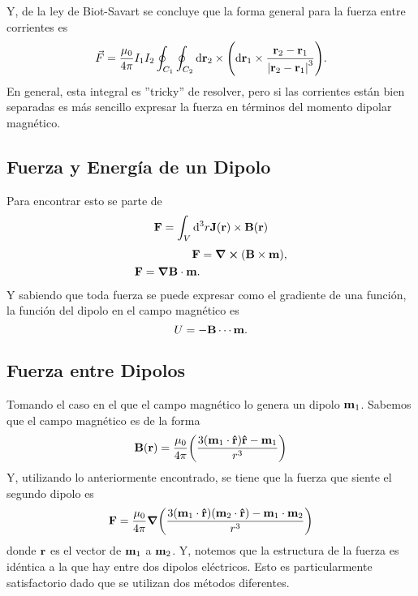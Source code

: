 Y, de la ley de Biot-Savart se concluye que la forma general para la fuerza entre corrientes es
\begin{equation}
    \vec{F} = \frac{\mu_0}{4\pi} I_1 I_2 \oint _{C_1} \oint _{C_2} \dd{\vb{r}_2} \times \qty(\dd{\vb{r}_1} \times \frac{\vb{r}_2 - \vb{r}_1}{\abs{\vb{r}_2 - \vb{r}_1}^3}).
\end{equation}
En general, esta integral es ''tricky'' de resolver, pero si las corrientes están bien separadas es más sencillo expresar la fuerza en términos del momento dipolar magnético.


\subsection{Fuerza y Energía de un Dipolo}
Para encontrar esto se parte de
\begin{equation}
    \vb{F} = \int _V \dd ^3 r \vb{J} (\vb{r}) \times \vb{B} (\vb{r})
\end{equation}
\begin{align}
    \vb{F} &= \curl{(\vb{B} \times \vb{m})}, \\
    \vb{F} = \grad{\vb{B} \cdot \vb{m}}.
\end{align}
Y sabiendo que toda fuerza se puede expresar como el gradiente de una función, la función del dipolo en el campo magnético es
\begin{equation}
    U = -\vb{B} \cdots \vb{m}.
\end{equation}


\subsection{Fuerza entre Dipolos}
Tomando el caso en el que el campo magnético lo genera un dipolo $\vb{m} _1$. Sabemos que el campo magnético es de la forma
\begin{equation}
    \vb{B} (\vb{r}) = \frac{\mu_0}{4\pi} \qty(\frac{3(\vb{m}_1 \cdot \vu{r}) \vu{r} - \vb{m}_1}{r^3})
\end{equation}
Y, utilizando lo anteriormente encontrado, se tiene que la fuerza que siente el segundo dipolo es
\begin{equation}
    \vb{F} = \frac{\mu_0}{4\pi} \grad{\qty(\frac{3(\vb{m}_1 \cdot \vu{r}) (\vb{m}_2 \cdot \vu{r}) - \vb{m}_1 \cdot \vb{m}_2}{r^3})}
\end{equation}
donde $\vb{r}$ es el vector de $\vb{m}_1$ a $\vb{m}_2$. Y, notemos que la estructura de la fuerza es idéntica a la que hay entre dos dipolos eléctricos. Esto es particularmente satisfactorio dado que se utilizan dos métodos diferentes.



